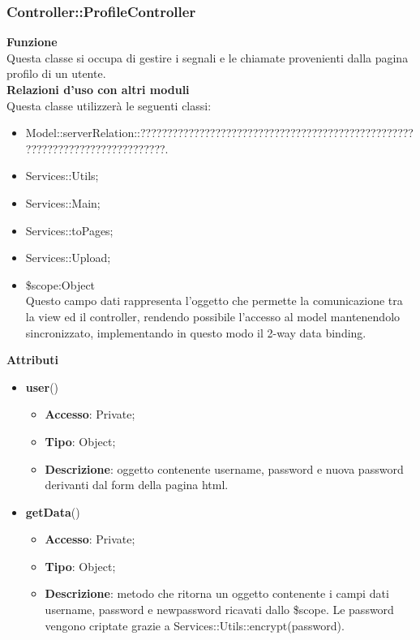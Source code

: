 {\subsubsection{Controller::ProfileController}{
	\textbf{Funzione}\\
	\indent Questa classe si occupa di gestire i segnali e le chiamate provenienti dalla pagina profilo di un utente.\\
	\textbf{Relazioni d'uso con altri moduli}\\
	\indent Questa classe utilizzerà le seguenti classi:
	\begin{itemize}
		\item Model::\-serverRelation::\-?????????????????????????????????????????????????????????????????????????????.
		\item Services::Utils;
		\item Services::Main;
		\item Services::toPages;
		\item Services::Upload;
		\item \$scope:Object\\
			\indent Questo campo dati rappresenta l’oggetto che permette la comunicazione tra la view ed il controller, rendendo possibile l’accesso al model mantenendolo sincronizzato, implementando in questo modo il 2-way data binding.
	\end{itemize}
	\textbf{Attributi}\\
    \begin{itemize}
    	\item \textbf{user}()
		\begin{itemize}
			\item \textbf{Accesso}: Private;
			\item \textbf{Tipo}: Object;
			\item \textbf{Descrizione}: oggetto contenente username, password e nuova password derivanti dal form della pagina html.
		\end{itemize}
    	\item \textbf{getData}()
		\begin{itemize}
			\item \textbf{Accesso}: Private;
			\item \textbf{Tipo}: Object;
			\item \textbf{Descrizione}: metodo che ritorna un oggetto contenente i campi dati username, password e newpassword ricavati dallo \$scope. Le password vengono criptate grazie a Services::\-Utils::\-encrypt(password).
		\end{itemize}

\end{itemize}}}
